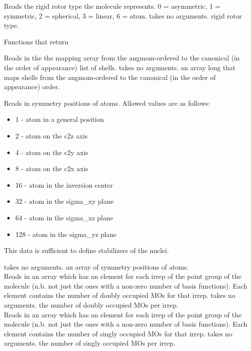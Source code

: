 \noindent {}
{Reads the rigid rotor type the molecule represents.
0 = asymmetric, 1 = symmetric, 2 = spherical, 3 = linear, 6 = atom.}
{takes no arguments.}
{rigid rotor type.}

\begin{center}
Functions that return 
\end{center}
{Reads in the the mapping array from the angmom-ordered
to the canonical (in the order of appearance) list of shells.}
{takes no arguments.}
{an array  long that maps shells from the angmom-ordered
to the canonical (in the order of appearance) order.}

\noindent {}
{Reads in symmetry positions of atoms.
Allowed values are as follows:
\begin{itemize}
\item 1   - atom in a general position
\item 2   - atom on the c2z axis
\item 4   - atom on the c2y axis
\item 8   - atom on the c2x axis
\item 16  - atom in the inversion center
\item 32  - atom in the sigma\_xy plane
\item 64  - atom in the sigma\_xz plane
\item 128 - atom in the sigma\_yz plane
\end{itemize}
This data is sufficient to define stabilizers of the nuclei.}
{takes no arguments.}
{an array of symmetry positions of atoms.} \\

\noindent {}
{Reads in an array which has an element for each irrep of the
point group of the molecule (n.b. not just the ones
with a non-zero number of basis functions). Each element
contains the number of doubly occupied MOs for that irrep.}
{takes no arguments.}
{the number of doubly occupied MOs per irrep.} \\

\noindent {}
{Reads in an array which has an element for each irrep of the
point group of the molecule (n.b. not just the ones
with a non-zero number of basis functions).  Each element
contains the number of singly occupied MOs for that irrep.}
{takes no arguments.}
{the number of singly occupied MOs per irrep.} \\

